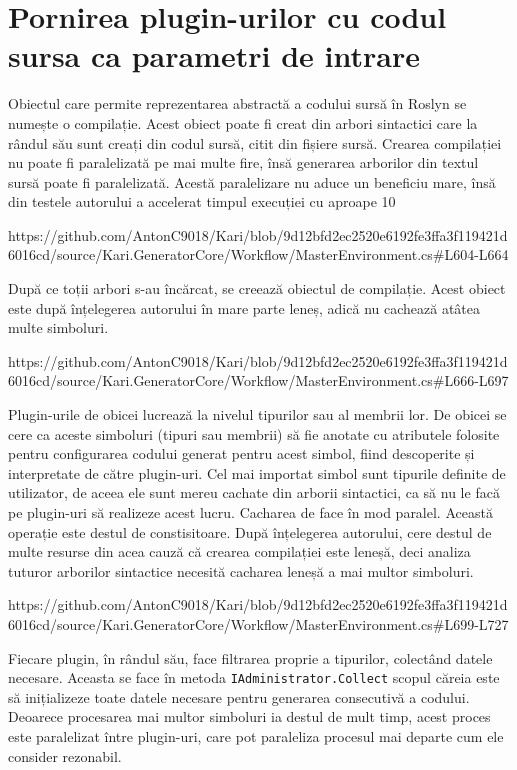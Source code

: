 \documentclass{report}
\begin{document}
\section{Pornirea plugin-urilor cu codul sursa ca parametri de intrare}

Obiectul care permite reprezentarea abstractă a codului sursă în Roslyn se numește o compilație.
Acest obiect poate fi creat din arbori sintactici care la rândul său sunt creați din codul sursă, citit din fișiere sursă.
Crearea compilației nu poate fi paralelizată pe mai multe fire, însă generarea arborilor din textul sursă poate fi paralelizată.
Acestă paralelizare nu aduce un beneficiu mare, însă din testele autorului a accelerat timpul execuției cu aproape 10%

https://github.com/AntonC9018/Kari/blob/9d12bfd2ec2520e6192fe3ffa3f119421d6016cd/source/Kari.GeneratorCore/Workflow/MasterEnvironment.cs#L604-L664

După ce toții arbori s-au încărcat, se creează obiectul de compilație.
Acest obiect este după înțelegerea autorului în mare parte leneș, adică nu cachează atâtea multe simboluri.

https://github.com/AntonC9018/Kari/blob/9d12bfd2ec2520e6192fe3ffa3f119421d6016cd/source/Kari.GeneratorCore/Workflow/MasterEnvironment.cs#L666-L697

Plugin-urile de obicei lucrează la nivelul tipurilor sau al membrii lor.
De obicei se cere ca aceste simboluri (tipuri sau membrii) să fie anotate cu atributele folosite pentru configurarea codului generat pentru acest simbol, fiind descoperite și interpretate de către plugin-uri.
Cel mai importat simbol sunt tipurile definite de utilizator, de aceea ele sunt mereu cachate din arborii sintactici, ca să nu le facă pe plugin-uri să realizeze acest lucru.
Cacharea de face în mod paralel.
Această operație este destul de constisitoare.
După înțelegerea autorului, cere destul de multe resurse din acea cauză că crearea compilației este leneșă, deci analiza tuturor arborilor sintactice necesită cacharea leneșă a mai multor simboluri.

https://github.com/AntonC9018/Kari/blob/9d12bfd2ec2520e6192fe3ffa3f119421d6016cd/source/Kari.GeneratorCore/Workflow/MasterEnvironment.cs#L699-L727

Fiecare plugin, în rândul său, face filtrarea proprie a tipurilor, colectând datele necesare.
Aceasta se face în metoda \texttt{IAdministrator.Collect} scopul căreia este să inițializeze toate datele necesare pentru generarea consecutivă a codului.
Deoarece procesarea mai multor simboluri ia destul de mult timp, acest proces este paralelizat între plugin-uri, care pot paraleliza procesul mai departe cum ele consider rezonabil.
\end{document}
